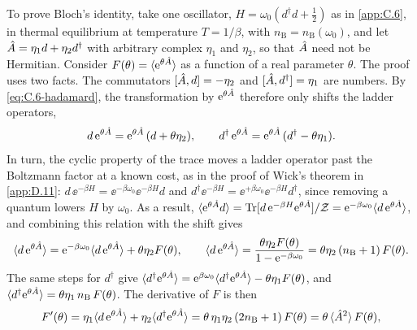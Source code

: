 To prove Bloch's identity, take one oscillator, $H = \omega_0(d^\dagger d + \tfrac12)$ as in \cref{app:C.6}, in thermal equilibrium at temperature $T = 1/\beta$, with $n_{\mathrm{B}} = n_{\mathrm{B}}(\omega_0)$, and let $\hat{A} = \eta_1d + \eta_2d^\dagger$ with arbitrary complex $\eta_1$ and $\eta_2$, so that $\hat{A}$ need not be Hermitian. Consider $F(\theta) = \langle\mathrm{e}^{\theta\hat{A}}\rangle$ as a function of a real parameter $\theta$. The proof uses two facts. The commutators $[\hat{A}, d] = -\eta_2$ and $[\hat{A}, d^\dagger] = \eta_1$ are numbers. By \cref{eq:C.6-hadamard}, the transformation by $\mathrm{e}^{\theta\hat{A}}$ therefore only shifts the ladder operators,
\begin{equation*}
  d\,\mathrm{e}^{\theta\hat{A}} = \mathrm{e}^{\theta\hat{A}}\,(d + \theta\eta_2), \qquad d^\dagger\,\mathrm{e}^{\theta\hat{A}} = \mathrm{e}^{\theta\hat{A}}\,(d^\dagger - \theta\eta_1) .
\end{equation*}
In turn, the cyclic property of the trace moves a ladder operator past the Boltzmann factor at a known cost, as in the proof of Wick's theorem in \cref{app:D.11}: $d\,\ee^{-\beta H} = \ee^{-\beta\omega_0}\ee^{-\beta H}d$ and $d^\dagger\ee^{-\beta H} = \ee^{+\beta\omega_0}\ee^{-\beta H}d^\dagger$, since removing a quantum lowers $H$ by $\omega_0$. As a result, $\langle\mathrm{e}^{\theta\hat{A}}d\rangle = \operatorname{Tr}[d\,\mathrm{e}^{-\beta H}\mathrm{e}^{\theta\hat{A}}]/\mathcal{Z} = \mathrm{e}^{-\beta\omega_0}\langle d\,\mathrm{e}^{\theta\hat{A}}\rangle$, and combining this relation with the shift gives
\begin{equation*}
  \langle d\,\mathrm{e}^{\theta\hat{A}}\rangle = \mathrm{e}^{-\beta\omega_0}\langle d\,\mathrm{e}^{\theta\hat{A}}\rangle + \theta\eta_2F(\theta), \qquad
  \langle d\,\mathrm{e}^{\theta\hat{A}}\rangle = \frac{\theta\eta_2F(\theta)}{1 - \mathrm{e}^{-\beta\omega_0}} = \theta\eta_2\,(n_{\mathrm{B}} + 1)\,F(\theta) .
\end{equation*}
The same steps for $d^\dagger$ give $\langle d^\dagger\mathrm{e}^{\theta\hat{A}}\rangle = \mathrm{e}^{\beta\omega_0}\langle d^\dagger\mathrm{e}^{\theta\hat{A}}\rangle - \theta\eta_1F(\theta)$, and $\langle d^\dagger\mathrm{e}^{\theta\hat{A}}\rangle = \theta\eta_1\,n_{\mathrm{B}}\,F(\theta)$. The derivative of $F$ is then
\begin{equation*}
  F'(\theta) = \eta_1\langle d\,\mathrm{e}^{\theta\hat{A}}\rangle + \eta_2\langle d^\dagger\mathrm{e}^{\theta\hat{A}}\rangle = \theta\,\eta_1\eta_2\,(2n_{\mathrm{B}} + 1)\,F(\theta) = \theta\,\langle\hat{A}^2\rangle\,F(\theta) ,
\end{equation*}
